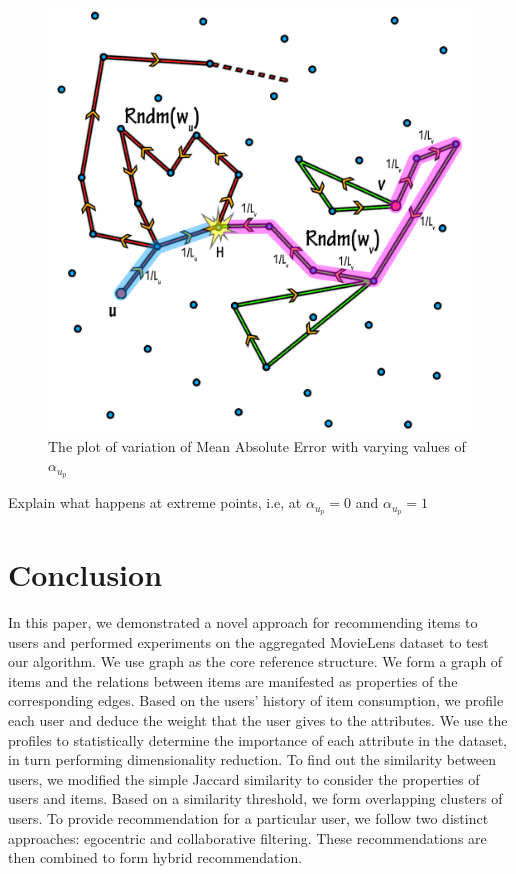 \documentclass{acm_proc_article-sp}
\begin{document}
\begin{figure}[htp]
\centering
\includegraphics[scale=0.05]{Results/LearningComponent.jpg}
\caption{The plot of variation of Mean Absolute Error with varying values of $\alpha_{u_p}$}
\label{movielens_mae_alpha}
\end{figure}

Explain what happens at extreme points, i.e, at $\alpha_{u_p} = 0$ and $\alpha_{u_p} = 1$

% 

\section{Conclusion}
\label{sec:conclusion}
In this paper, we demonstrated a novel approach for recommending items to users and performed experiments on the aggregated MovieLens dataset to test our algorithm. We use graph as the core reference structure. We form a graph of items and the relations between items are manifested as properties of the corresponding edges. Based on the users' history of item consumption, we profile each user and deduce the weight that the user gives to the attributes. We use the profiles to statistically determine the importance of each attribute in the dataset, in turn performing dimensionality reduction. To find out the similarity between users, we modified the simple Jaccard similarity to consider the properties of users and items. Based on a similarity threshold, we form overlapping clusters of users. To provide recommendation for a particular user, we follow two distinct approaches: egocentric and collaborative filtering. These recommendations are then combined to form hybrid recommendation.
\end{document}
